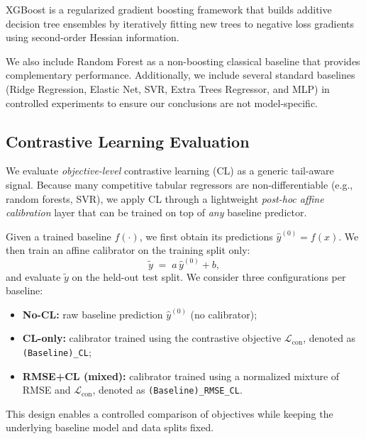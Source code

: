\documentclass[11pt,conference,onecolumn]{IEEEtran}
\begin{document}
XGBoost is a regularized gradient boosting framework that builds additive decision tree ensembles by iteratively fitting new trees to negative loss gradients using second-order Hessian information.

We also include Random Forest as a non-boosting classical baseline that provides complementary performance. Additionally, we include several standard baselines (Ridge Regression, Elastic Net, SVR, Extra Trees Regressor, and MLP) in controlled experiments to ensure our conclusions are not model-specific.

\subsection{Contrastive Learning Evaluation}
\label{sec:contrastive}
We evaluate \emph{objective-level} contrastive learning (CL) as a generic tail-aware signal. Because many competitive tabular regressors are non-differentiable (e.g., random forests, SVR), we apply CL through a lightweight \emph{post-hoc affine calibration} layer that can be trained on top of \emph{any} baseline predictor.

Given a trained baseline $f(\cdot)$, we first obtain its predictions $\hat{y}^{(0)}=f(x)$. We then train an affine calibrator on the training split only:
\begin{equation}
\tilde{y} \;=\; a\,\hat{y}^{(0)} + b,
\end{equation}
and evaluate $\tilde{y}$ on the held-out test split. We consider three configurations per baseline:
\begin{itemize}
    \item \textbf{No-CL:} raw baseline prediction $\hat{y}^{(0)}$ (no calibrator);
    \item \textbf{CL-only:} calibrator trained using the contrastive objective $\mathcal{L}_{\mathrm{con}}$, denoted as \texttt{(Baseline)\_CL};
    \item \textbf{RMSE+CL (mixed):} calibrator trained using a normalized mixture of RMSE and $\mathcal{L}_{\mathrm{con}}$, denoted as \texttt{(Baseline)\_RMSE\_CL}.
\end{itemize}
This design enables a controlled comparison of objectives while keeping the underlying baseline model and data splits fixed.
\end{document}
